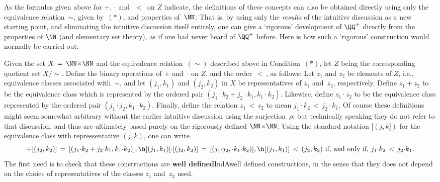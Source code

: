 {{        As the formulas given above for $+$, ${\cdot}$ and~$\,<\,$ on $Z$ indicate,
    the definitions of these concepts can also be obtained directly using only the equivalence relation~$\sim$, given by~$({\ast})$, and properties of~${\NN}$.
    That is, by using only the {\em results} of the intuitive discussion as a new starting point, and eliminating the intuitive discussion itself entirely,
    one can give a `rigorous' development of ${\QQ}^{+}$ directly from the properties of ${\NN}$ (and elementary set theory),
    as if one had never heard of ${\QQ}^{+}$ before. Here is how such a `rigorous' construction would normally be carried out:

        Given the set $X \,=\, {\NN}{\times}{\NN}$ and the equivalence relation~$(\sim)$ described above in Condition~$({\ast})$,
    let $Z$ being the corresponding quotient set $X/\sim$. Define the binary operations of $+$ and~${\cdot}$ on $Z$, and the order $\,<\,$, as follows:
    Let $z_{1}$ and $z_{2}$ be elements of $Z$, i.e., equivalence classes associated with~${\sim}$,
    and let $(j_{1},k_{1})$ and $(j_{2},k_{2})$ in $X$ be representatives of $z_{1}$ and~$z_{2}$, respectively.
    Define $z_{1} + z_{2}$ to be the equivalence class which is represented by the ordered pair $(j_{1}{\cdot}k_{2} + j_{2}{\cdot}k_{1}, k_{1}{\cdot}k_{2})$.
    Likewise, define $z_{1}{\cdot}z_{2}$ to be the equivalence class represented by the ordered pair $(j_{1}{\cdot}j_{2}, k_{1}{\cdot}k_{2})$.
    Finally, define the relation $z_{1}\,<\,z_{2}$ to mean $j_{1}{\cdot}k_{2}\,<\,j_{2}{\cdot}k_{1}$.
    Of course these definitions might seem somewhat arbitrary without the earlier intuitive discussion using the surjection~${\rho}$;
    but technically speaking they do not refer to that discussion, and thus are ultimately based purely on the rigorously defined ${\NN}{\times}{\NN}$.
    Using the standard notation $[(j,k])$ for the equivalence class with repressentative $(j,k)$,
    one can write 
        \begin{displaymath}
        [(j_{1},k_{1})] + [(j_{2},k_{2})] \,=\, [(j_{1}{\cdot}k_{2} + j_{2}{\cdot}k_{1}, k_{1}{\cdot}k_{2})], \h
        [(j_{1},k_{1})]{\cdot}[(j_{2},k_{2})] \,=\, [(j_{1}{\cdot}j_{2},{\cdot} k_{1}{\cdot}k_{2})], \h
        [(j_{1},k_{1})] \,<\, {(j_{2},k_{2})} \mbox{ if, and only if, }
        j_{1}{\cdot}k_{2}\,<\,j_{2}{\cdot}k_{1}.
        \end{displaymath}
    The first need is to check that these constructions are {\bf well defined}IndA{well defined constructions},
    in the sense that they does not depend on the choice of representatives of the classes $z_{1}$ and~$z_{2}$ used.
}}
